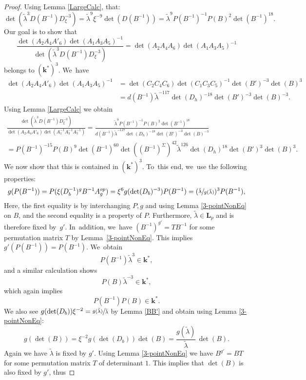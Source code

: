 \documentclass[10pt,a4paper]{amsart}
\newcommand{\op}{\textup{op}}
\theoremstyle{definition}
\newcommand{\kk}{{\boldsymbol{k}}}
\newcommand{\LL}{{\boldsymbol{L}}}
\begin{document}
\begin{proof}
Using Lemma \ref{LargeCalc}, that:
\[
\det(\tilde \lambda^3 D(B^{-1})D_{\xi}^{-3}) = \tilde \lambda^9 \xi^{-9} \det(D(B^{-1})) = \tilde \lambda^9 P(B^{-1})^{-1} P(B)^2 \det(B^{-1})^{18}.
\]
Our goal is to show that
\[
\frac{\det(A_2A_4A'_6)\det(A_1A_3A_5)^{-1}} {\det(\tilde \lambda^{3}D(B^{-1}) D_{\xi}^{-3})} = \det(A_2A_4A_6)\det(A_1A_3A_5)^{-1}
\]
belongs to $(\kk^*)^3$. We~have
\begin{align*}
\det(A_2A_4A'_6)\det(A_1A_3A_5)^{-1} &= \det(C_2C_4C_6)\det(C_1C_3C_5)^{-1} \det(B')^{-3}\det(B)^3
\\
&= d(B^{-1}) \tilde \lambda^{-117} \det(D_h)^{-18}\det(B')^{-3}\det(B)^{-3}.
\end{align*}
Using Lemma \ref{LargeCalc} we obtain
\begin{multline*}
\frac{\det(\tilde \lambda^3 D(B^{-1})D_{\xi}^{-3})}{\det(A_2A_4A'_6)\det(A_1^{-1}A_3^{-1}A_5^{-1})} = \frac{\tilde \lambda^9 P(B^{-1})^{-1} P(B)^2 \det(B^{-1})^{18}}{d(B^{-1}) \tilde \lambda^{-117} \det(D_h)^{-18}\det(B')^{-3}\det(B)^{-3}}
\\
= P(B^{-1})^{-15} P(B)^9 \det(B^{-1})^{60} \det((B^{-1})^{\Sigma})^{42} \tilde \lambda^{126} \det(D_h)^{18}\det(B')^3\det(B)^3.
\end{multline*}
We now show that this is contained in $(\kk^*)^3$. To~this end, we~use the following properties:
\[
g(P(B^{-1})) = P(\xi (D_b^{-1})^gB^{-1}A_g^{\op}) = \xi^6 g(\det(D_b)^{-3}) P(B^{-1}) = (\sfrac{\tilde \lambda}{g(\tilde \lambda)})^3P(B^{-1}),
\]
Here, the first equality is by interchanging $P,g$ and using Lemma \ref{3-pointNonEq} on $B$, and the second equality is a property of $P$. Furthermore, $\tilde{\lambda} \in \LL_p$ and is therefore fixed by~$g'$. In~addition, we~have $(B^{-1})^{g'} = T B^{-1}$ for some permutation matrix $T$ by Lemma~\ref{3-pointNonEq}. This implies $g'(P(B^{-1})) = P(B^{-1})$. We~obtain
\begin{equation} \label{eq:1P}
P(B^{-1}) \tilde \lambda^3 \in \kk^*,
\end{equation}
and a similar calculation shows
\[
P(B)\tilde \lambda^{-3} \in \kk^*,
\]
which again implies
\begin{equation} \label{eq:2Ps}
P(B^{-1})P(B)\in \kk^*.
\end{equation}
We also see $g(\operatorname{det}(D_b))\xi^{-2} = \sfrac{g(\tilde \lambda)}{\tilde \lambda}$ by Lemma \ref{BB'} and obtain using Lemma \ref{3-pointNonEq}:
\[
g(\det(B)) = \xi^{-2} g(\det(D_b)) \det(B) = \frac{g(\tilde \lambda)}{\tilde \lambda}\, \det(B).
\]
Again we have $\tilde{\lambda}$ is fixed by $g'$. Using Lemma \ref{3-pointNonEq} we have $B^{g'} = B T$ for some permutation matrix $T$ of determinant $1$. This implies that $\det(B)$ is also fixed by $g'$, thus\vspace*{-3pt}

\end{proof}
\end{document}
